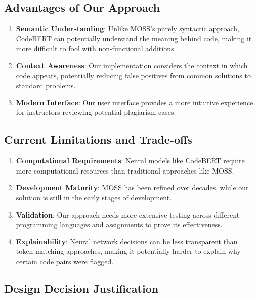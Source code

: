 \documentclass[12pt, titlepage]{article}
\begin{document}
\subsection{Advantages of Our Approach}

\begin{enumerate}
    \item \textbf{Semantic Understanding}: Unlike MOSS's purely syntactic approach, CodeBERT can potentially understand the meaning behind code, making it more difficult to fool with non-functional additions.

    \item \textbf{Context Awareness}: Our implementation considers the context in which code appears, potentially reducing false positives from common solutions to standard problems.

    \item \textbf{Modern Interface}: Our user interface provides a more intuitive experience for instructors reviewing potential plagiarism cases.
\end{enumerate}

\subsection{Current Limitations and Trade-offs}

\begin{enumerate}
    \item \textbf{Computational Requirements}: Neural models like CodeBERT require more computational resources than traditional approaches like MOSS.

    \item \textbf{Development Maturity}: MOSS has been refined over decades, while our solution is still in the early stages of development.

    \item \textbf{Validation}: Our approach needs more extensive testing across different programming languages and assignments to prove its effectiveness.

    \item \textbf{Explainability}: Neural network decisions can be less transparent than token-matching approaches, making it potentially harder to explain why certain code pairs were flagged.
\end{enumerate}

\subsection{Design Decision Justification}
\end{document}
